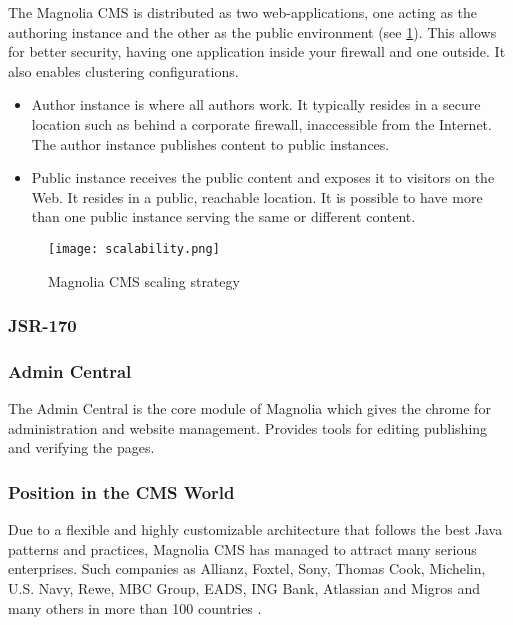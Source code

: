 The Magnolia CMS is distributed as two web-applications, one acting as the
authoring instance and the other as the public environment (see \ref{fig:scalability}). This allows for
better security, having one application inside your firewall and one outside. It
also enables clustering configurations.
\begin{itemize}
	\item Author instance is where all authors work. It typically resides in a
	secure location such as behind a corporate firewall, inaccessible from the
	Internet. The author instance publishes content to public instances.
	\item Public instance receives the public content and exposes it to visitors on
	the Web. It resides in a public, reachable location. It is possible to have more
	than one public instance serving the same or different content.
\end{itemize}
\begin{figure}[H]
	\centering
	\texttt{[image: scalability.png]}
	\caption{Magnolia CMS scaling strategy}
	\label{fig:scalability}
\end{figure}

\subsubsection{JSR-170}


\subsubsection{Admin Central}
The Admin Central is the core module of Magnolia which gives the chrome for
administration and website management. Provides tools for editing publishing
and verifying the pages.\cite{magnolia_shell}

\subsubsection{Position in the CMS World}
Due to a flexible and highly customizable architecture that follows the best
Java patterns and practices, Magnolia CMS has managed to attract many serious
enterprises. Such companies as Allianz, Foxtel, Sony, Thomas Cook, Michelin,
U.S. Navy, Rewe, MBC Group, EADS, ING Bank, Atlassian and Migros and many others
in more than 100 countries \cite{magnolia_customers}.
\pagebreak